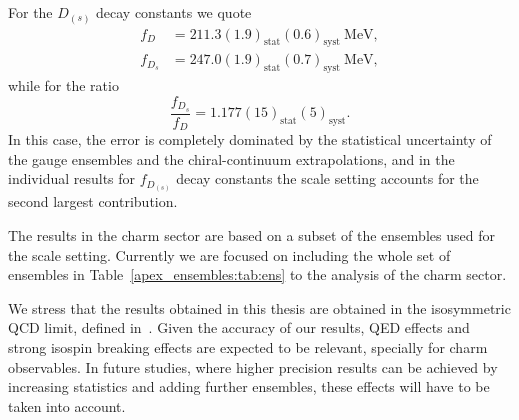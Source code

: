 For the $D_{(s)}$ decay constants we quote
\begin{align}
	f_D &= 211.3(1.9)_{\textrm{stat}}(0.6)_{\textrm{syst}} \ \mathrm{MeV},
	\\
	f_{D_s} &= 247.0(1.9)_{\textrm{stat}}(0.7)_{\textrm{syst}} \ \mathrm{MeV},
\end{align}
while for the ratio
\begin{equation}
	\frac{f_{D_s}}{f_D} = 1.177(15)_{\textrm{stat}}(5)_{\textrm{syst}}.
\end{equation}
In this case, the error is completely dominated by the statistical uncertainty of the gauge ensembles and the chiral-continuum extrapolations, and in the individual results for $f_{D_{(s)}}$ decay constants the scale setting accounts for the second largest contribution.

The results in the charm sector are based on a subset of the ensembles used for the scale setting. Currently we are focused on including the whole set of ensembles in Table~\ref{apex_ensembles:tab:ens} to the analysis of the charm sector.

We stress that the results obtained in this thesis are obtained in the isosymmetric QCD limit, defined in~\citep{FlavourLatticeAveragingGroupFLAG:2021npn}. Given the accuracy of our results, QED effects and strong isospin breaking effects are expected to be relevant, specially for charm observables. In future studies, where higher precision results can be achieved by increasing statistics and adding further ensembles, these effects will have to be taken into account.


